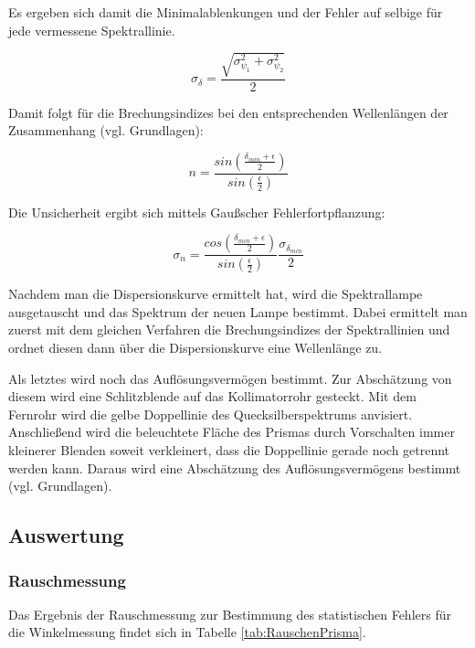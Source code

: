 \documentclass[12pt,a4paper]{article}
\begin{document}
	Es ergeben sich damit die Minimalablenkungen und der Fehler auf selbige für jede vermessene Spektrallinie.
	
	\begin{equation}
	\sigma_{\delta} = \frac{\sqrt{\sigma_{\psi_1}^2+\sigma_{\psi_2}^2}}{2}
	\label{eq:Fehler_delta}
	\end{equation}
	
	Damit folgt für die Brechungsindizes bei den entsprechenden Wellenlängen der Zusammenhang (vgl. Grundlagen):
	
	\begin{equation}
	n = \frac{sin(\frac{\delta_{min}+\epsilon}{2})}{sin(\frac{\epsilon}{2})}
	\end{equation}
	
	Die Unsicherheit ergibt sich mittels Gaußscher Fehlerfortpflanzung:
	
	\begin{equation}
	\sigma_n = \frac{cos(\frac{\delta_{min}+\epsilon}{2})}{sin(\frac{\epsilon}{2})} \frac{\sigma_{\delta_{min}}}{2}
	\end{equation}

Nachdem man die Dispersionskurve ermittelt hat, wird die Spektrallampe ausgetauscht und das Spektrum der neuen Lampe bestimmt. 
Dabei ermittelt man zuerst mit dem gleichen Verfahren die Brechungsindizes der Spektrallinien und ordnet diesen dann über die Dispersionskurve eine Wellenlänge zu.

Als letztes wird noch das Auflösungsvermögen bestimmt.	
Zur Abschätzung von diesem wird eine Schlitzblende auf das Kollimatorrohr gesteckt. Mit dem Fernrohr wird die gelbe Doppellinie des Quecksilberspektrums anvisiert.  Anschließend wird die beleuchtete Fläche des Prismas durch Vorschalten immer kleinerer Blenden soweit verkleinert, dass die Doppellinie gerade noch getrennt werden kann. Daraus wird eine Abschätzung des Auflösungsvermögens bestimmt (vgl. Grundlagen). 


\subsection{Auswertung}

\subsubsection{Rauschmessung}

Das Ergebnis der Rauschmessung zur Bestimmung des statistischen Fehlers für die Winkelmessung findet sich in Tabelle \ref{tab:RauschenPrisma}.
\end{document}
